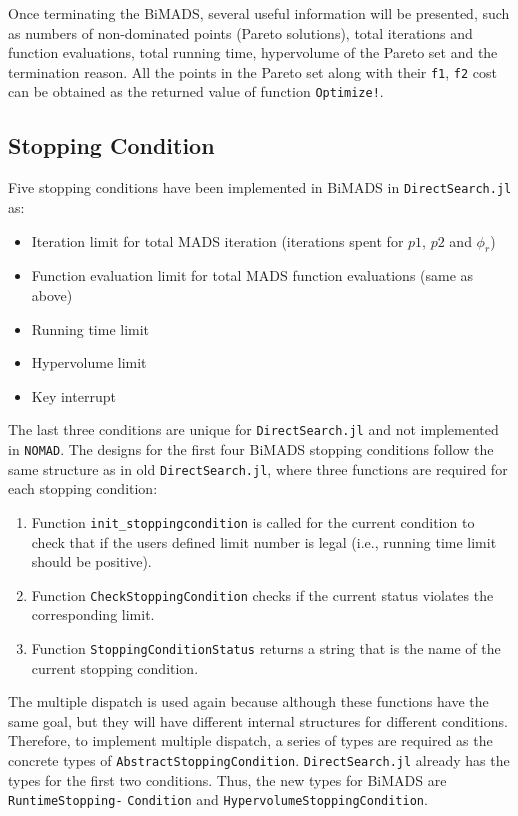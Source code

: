 \documentclass[11pt,oneside,onecolumn,openright]{article}
\begin{document}
  Once terminating the BiMADS, several useful information will be presented, such as numbers of non-dominated points (Pareto solutions), total iterations and function evaluations, total running time, hypervolume of the Pareto set and the termination reason. All the points in the Pareto set along with their \verb|f1|, \verb|f2| cost can be obtained as the returned value of function \verb|Optimize!|.

  \subsection{Stopping Condition}\label{sec:stop}
  Five stopping conditions have been implemented in BiMADS in \verb|DirectSearch.jl| as: 
  \begin{itemize}
    \item Iteration limit for total MADS iteration (iterations spent for $p1$, $p2$ and $\phi_r$)
    \item Function evaluation limit for total MADS function evaluations (same as above)
    \item Running time limit
    \item Hypervolume limit
    \item Key interrupt
  \end{itemize}

  The last three conditions are unique for \verb|DirectSearch.jl| and not implemented in \verb|NOMAD|. The designs for the first four BiMADS stopping conditions follow the same structure as in old \verb|DirectSearch.jl|, where three functions are required for each stopping condition:
  \begin{enumerate}
    \item Function \verb|init_stoppingcondition| is called for the current condition to check that if the users defined limit number is legal (i.e., running time limit should be positive).
    \item Function \verb|CheckStoppingCondition| checks if the current status violates the corresponding limit.
    \item Function \verb|StoppingConditionStatus| returns a string that is the name of the current stopping condition.
  \end{enumerate}
  The multiple dispatch is used again because although these functions have the same goal, but they will have different internal structures for different conditions. Therefore, to implement multiple dispatch, a series of types are required as the concrete types of \verb|AbstractStoppingCondition|. \verb|DirectSearch.jl| already has the types for the first two conditions. Thus, the new types for BiMADS are \verb|RuntimeStopping-| \verb|Condition| and \verb|HypervolumeStoppingCondition|. 
\end{document}

